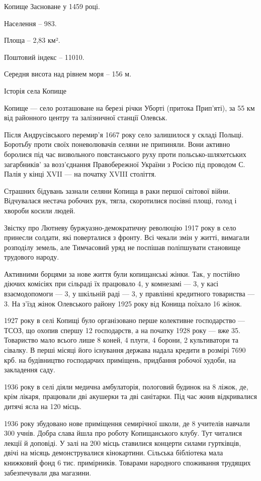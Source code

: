Копище
Засноване у 1459 році.

Населення – 983.

Площа – 2,83 км².

Поштовий індекс – 11010.

Середня висота над рівнем моря – 156 м.


Історія села Копище

Копище — село розташоване на березі річки Уборті (притока Прип’яті), за 55 км від районного центру та залізничної станції Олевськ.

Після Андрусівського перемир’я 1667 року село залишилося у складі Польщі. Боротьбу проти своїх поневолювачів селяни не припиняли. Вони активно боролися під час визвольного повстанського руху проти польсько-шляхетських загарбників’ за возз’єднання Правобережної України з Росією під проводом С. Палія у кінці XVII — на початку XVIII століття.

Страшних бідувань зазнали селяни Копища в раки першої світової війни. Відчувалася нестача робочих рук, тягла, скоротилися посівні площі, голод і хвороби косили людей.

Звістку про Лютневу буржуазно-демократичну революцію 1917 року в село принесли солдати, які поверталися з фронту. Всі чекали змін у житті, вимагали розподілу земель, але Тимчасовий уряд не поспішав поліпшувати становище трудового народу.

Активними борцями за нове життя були копищанські жінки. Так, у постійно діючих комісіях при сільраді їх працювало 4, у комнезамі — 3, у касі взаємодопомоги — 3, у шкільній раді — 3, у правлінні кредитного товариства — 3. На з’їзд жінок Олевського району 1925 року від Конища поїхало 16 жінок.

1927 року в селі Копищі було організовано перше колективне господарство — ТСОЗ, що охопив спершу 12 господарств, а на початку 1928 року — вже 35. Товариство мало всього лише 8 коней, 4 плуги, 4 борони, 2 культиватори та сівалку. В перші місяці його існування держава надала кредити в розмірі 7690 крб. на будівництво господарчих приміщень, придбання робочої худоби, на закладення саду.

1936 року в селі діяли медична амбулаторія, пологовий будинок на 8 ліжок, де, крім лікаря, працювали дві акушерки та дві санітарки. Під час жнив відкривалися дитячі ясла на 120 місць.

1936 року збудовано нове приміщення семирічної школи, де 8 учителів навчали 300 учнів. Добра слава йшла про роботу Копищанського клубу. Тут читалися лекції й доповіді. У залі на 200 місць ставилися концерти силами гуртківців, двічі на місяць демонструвалися кінокартини. Сільська бібліотека мала книжковий фонд 6 тис. примірників. Товарами народного споживання трудящих забезпечували два магазини.

